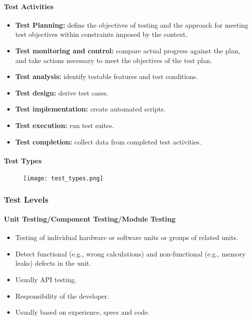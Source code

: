 \documentclass[../ESOF_notes.tex]{subfiles}
\begin{document}
\paragraph{Test Activities}
\begin{itemize}
    \item \textbf{Test Planning:} define the objectives of
          testing and the approach for meeting test objectives 
          within constraints imposed by the context.
    \item \textbf{Test monitoring and control:} compare actual
          progress against the plan, and take actions necessary 
          to meet the objectives of the test plan.
    \item \textbf{Test analysis:} identify testable features
          and test conditions.
    \item \textbf{Test design:} derive test cases.
    \item \textbf{Test implementation:} create automated scripts.
    \item \textbf{Test execution:} run test suites.
    \item \textbf{Test completion:} collect data from completed
          test activities.
\end{itemize}
\paragraph{Test Types}
\begin{figure}[h!]
    \centering
    \texttt{[image: test\_types.png]}
\end{figure}
\subsubsection{Test Levels}
\paragraph{Unit Testing/Component Testing/Module Testing}
\begin{itemize}
    \item Testing of individual hardware or software units or
          groups of related units.
    \item Detect functional (e.g., wrong calculations)
          and non-functional (e.g., memory leaks) defects in 
          the unit.
    \item Usually API testing.
    \item Responsibility of the developer.
    \item Usually based on experience, specs and code.
\end{itemize}
\end{document}
